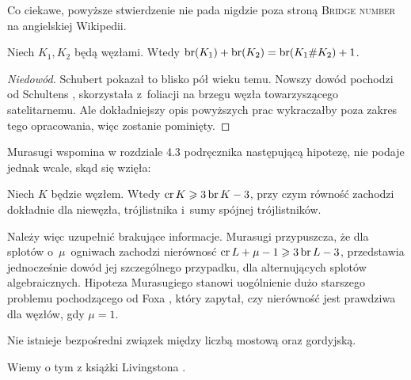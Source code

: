 Co ciekawe, powyższe stwierdzenie nie pada nigdzie poza stroną \textsc{Bridge number} na angielskiej Wikipedii.

\begin{proposition}
\label{prp:bridge_additive}%
    Niech $K_1, K_2$ będą węzłami.
    Wtedy $\operatorname{br} (K_1) + \operatorname{br}(K_2) = \operatorname{br}(K_1 \# K_2) + 1$.
\end{proposition}

\begin{proof}[Niedowód]
%
%
    Schubert \cite[s. 279]{schubert1954} pokazał to blisko pół wieku temu.
    Nowszy dowód pochodzi od Schultens \cite{schultens2003}, skorzystała z~foliacji na brzegu węzła towarzyszącego satelitarnemu.
    Ale dokładniejszy opis powyższych prac wykraczałby poza zakres tego opracowania, więc zostanie pominięty.
\end{proof}

Murasugi wspomina w rozdziale 4.3 podręcznika \cite{murasugi1996} następującą hipotezę, nie podaje jednak wcale, skąd się wzięła:
%

\begin{conjecture}
%
    Niech $K$ będzie węzłem.
    Wtedy $\operatorname{cr} K \geqslant 3 \operatorname{br} K - 3$, przy czym równość zachodzi dokładnie dla niewęzła, trójlistnika i~sumy spójnej trójlistników.
\end{conjecture}

Należy więc uzupełnić brakujące informacje.
Murasugi \cite{murasugi1988} przypuszcza, że dla splotów o~$\mu$~ogniwach zachodzi nierównosć $\operatorname{cr} L + \mu - 1 \geqslant 3 \operatorname{br} L - 3$, przedstawia jednocześnie dowód jej szczególnego przypadku, dla alternujących splotów algebraicznych.
%
Hipoteza Murasugiego stanowi uogólnienie dużo starszego problemu pochodzącego od Foxa \cite{fox1950}, który zapytał, czy nierówność jest prawdziwa dla węzłów, gdy $\mu = 1$.
%

\begin{proposition}
%
\label{no_relation_bridge_unknotting}%
    Nie istnieje bezpośredni związek między liczbą mostową oraz gordyjską.
\end{proposition}

Wiemy o tym z książki Livingstona \cite[s. 146]{livingston1993}.


